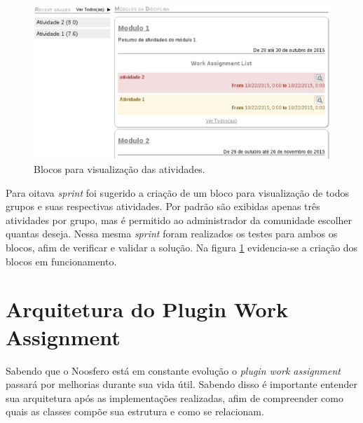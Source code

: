 \begin{figure}[h]
    \centering
    \includegraphics[keepaspectratio=true,scale=0.5]
      {figuras/blocos.eps}
    \caption{Blocos para visualização das atividades.}
    \label{fig:blocos}
\end{figure}

Para oitava \textit{sprint} foi sugerido a criação de um bloco para visualização de todos grupos e suas respectivas atividades. Por padrão são exibidas apenas três atividades por grupo, mas é permitido ao administrador da comunidade escolher quantas deseja. Nessa mesma \textit{sprint} foram realizados os testes para ambos os blocos, afim de verificar e validar a solução. Na figura \ref{fig:blocos} evidencia-se a criação dos blocos em funcionamento.





\section{Arquitetura do Plugin Work Assignment}


Sabendo que o Noosfero está em constante evolução o \textit{plugin work assignment} passará por melhorias durante sua vida útil. Sabendo disso é importante entender sua arquitetura após as implementações realizadas, afim de compreender como quais as classes compõe sua estrutura e como se relacionam.

